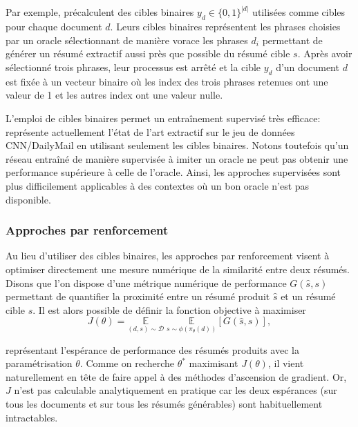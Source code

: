Par exemple, \citet{10.5555/3298483.3298681} précalculent des cibles binaires $y_d \in \{0,1\}^{|d|}$
utilisées comme cibles pour chaque document $d$.
Leurs cibles binaires représentent les phrases choisies par un oracle
sélectionnant de manière vorace les phrases $d_i$ permettant de générer
un résumé extractif aussi près que possible du résumé cible $s$.
Après avoir sélectionné trois phrases, leur processus est arrêté et la cible $y_d$
d'un document $d$ est fixée à un vecteur binaire où les index des trois phrases 
retenues ont une valeur de 1 et les autres index ont une valeur nulle.

L'emploi de cibles binaires permet un entraînement supervisé très efficace:
\citet{liu2019text} représente actuellement l'état de l'art extractif 
sur le jeu de données CNN/DailyMail \citep{hermann2015teaching}
en utilisant seulement les cibles binaires.
Notons toutefois qu'un réseau entraîné de manière supervisée à 
imiter un oracle ne peut pas obtenir une performance supérieure 
à celle de l'oracle.
Ainsi, les approches supervisées sont plus difficilement applicables
à des contextes où un bon oracle n'est pas disponible.

\subsubsection*{Approches par renforcement}
\label{subsec:rl_summ}

Au lieu d'utiliser des cibles binaires, les approches par renforcement visent à
optimiser directement une mesure numérique de la similarité entre deux résumés.
Disons que l'on dispose d'une métrique numérique de performance $G(\hat{s}, s)$
permettant de quantifier la proximité entre un résumé produit $\hat{s}$ et un résumé
cible $s$.
Il est alors possible de définir la fonction objective à maximiser
\begin{equation}
    J(\theta) = \underset{(d,s) \sim \mathcal{D}}{\mathbb{E}} \; \underset{s \sim \phi(\pi_\theta(d))}{\mathbb{E}} \left[G(\hat{s}, s) \right],
    \label{eq:REINFORCE_expectation}
\end{equation}

représentant l'espérance de performance des résumés produits avec la paramétrisation $\theta$.
Comme on recherche $\theta^*$ maximisant $J(\theta)$, il vient naturellement en tête
de faire appel à des méthodes d'ascension de gradient.
Or, $J$ n'est pas calculable analytiquement en pratique car les deux espérances (sur
tous les documents et sur tous les résumés générables) sont habituellement intractables.


